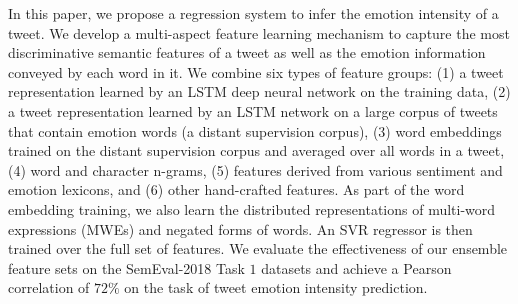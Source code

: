 In this paper, we propose a regression system to infer the emotion intensity of a tweet. We develop a multi-aspect feature learning mechanism to capture the most discriminative semantic features of a tweet as well as the emotion information conveyed by each word in it. We combine six types of feature groups: (1) a tweet representation learned by an LSTM deep neural network on the training data, (2) a tweet representation learned by an LSTM network on a large corpus of tweets that contain emotion words (a distant supervision corpus), (3) word embeddings trained on the distant supervision corpus and averaged over all words in a tweet, (4) word and character n-grams, (5) features derived from various sentiment and emotion lexicons, and (6) other hand-crafted features. As part of the word embedding training, we also learn the distributed representations of multi-word expressions (MWEs) and negated forms of words. An SVR regressor is then trained over the full set of features. We evaluate the effectiveness of our ensemble feature sets on the SemEval-2018 Task $1$ datasets and achieve a Pearson correlation of $72\%$ on the task of tweet emotion intensity prediction.
